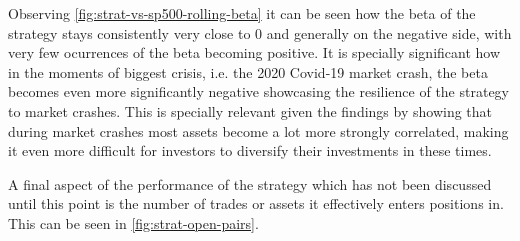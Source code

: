 Observing \autoref{fig:strat-vs-sp500-rolling-beta} it can be seen how the beta of the strategy stays consistently very close to 0 and generally on the negative side, with very few ocurrences of the beta becoming positive. It is specially significant how in the moments of biggest crisis, i.e. the 2020 Covid-19 market crash, the beta becomes even more significantly negative showcasing the resilience of the strategy to market crashes. This is specially relevant given the findings by \cite{sandoval_franca_2012} showing that during market crashes most assets become a lot more strongly correlated, making it even more difficult for investors to diversify their investments in these times. 


A final aspect of the performance of the strategy which has not been discussed until this point is the number of trades or assets it effectively enters positions in. This can be seen in \autoref{fig:strat-open-pairs}.

